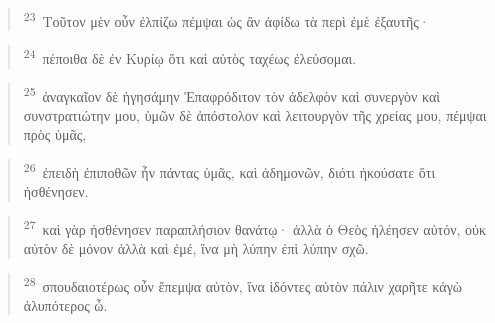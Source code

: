 \documentclass{article}
\newcommand{\currentverse}{1} %
\newcommand{\setcurrentverse}[1]{\renewcommand{\currentverse}{#1}}
\begin{document}
\begin{verse}

\setcurrentverse{23}

\setcounter{footnote}{0}

\textsuperscript{23}~Τοῦτον μὲν οὖν ἐλπίζω πέμψαι ὡς ἂν ἀφίδω τὰ περὶ ἐμὲ ἐξαυτῆς·

\end{verse}

\begin{verse}

\setcurrentverse{24}

\setcounter{footnote}{0}

\textsuperscript{24}~πέποιθα δὲ ἐν Κυρίῳ ὅτι καὶ αὐτὸς ταχέως ἐλεύσομαι.

\end{verse}

\begin{verse}

\setcurrentverse{25}

\setcounter{footnote}{0}

\textsuperscript{25}~ἀναγκαῖον δὲ ἡγησάμην Ἐπαφρόδιτον τὸν ἀδελφὸν καὶ συνεργὸν καὶ συνστρατιώτην μου, ὑμῶν δὲ ἀπόστολον καὶ λειτουργὸν τῆς χρείας μου, πέμψαι πρὸς ὑμᾶς,

\end{verse}

\begin{verse}

\setcurrentverse{26}

\setcounter{footnote}{0}

\textsuperscript{26}~ἐπειδὴ ἐπιποθῶν ἦν πάντας ὑμᾶς, καὶ ἀδημονῶν, διότι ἠκούσατε ὅτι ἠσθένησεν.

\end{verse}

\begin{verse}

\setcurrentverse{27}

\setcounter{footnote}{0}

\textsuperscript{27}~καὶ γὰρ ἠσθένησεν παραπλήσιον θανάτῳ· ἀλλὰ ὁ Θεὸς ἠλέησεν αὐτόν, οὐκ αὐτὸν δὲ μόνον ἀλλὰ καὶ ἐμέ, ἵνα μὴ λύπην ἐπὶ λύπην σχῶ.

\end{verse}

\begin{verse}

\setcurrentverse{28}

\setcounter{footnote}{0}

\textsuperscript{28}~σπουδαιοτέρως οὖν ἔπεμψα αὐτὸν, ἵνα ἰδόντες αὐτὸν πάλιν χαρῆτε κἀγὼ ἀλυπότερος ὦ.

\end{verse}
\end{document}
